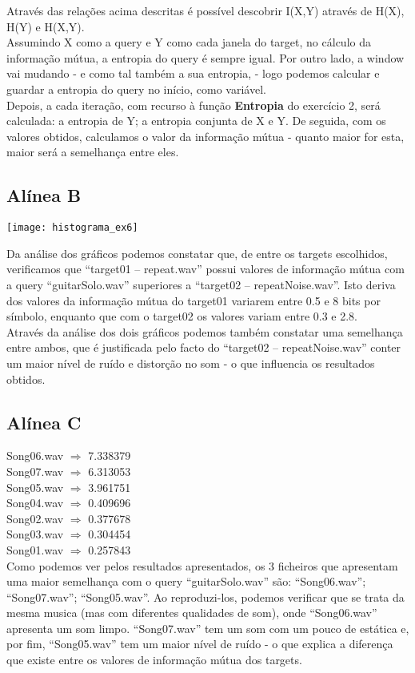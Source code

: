 \documentclass{article}
\begin{document}
Através das relações acima descritas é possível descobrir I(X,Y) através de H(X), H(Y) e H(X,Y).\\
Assumindo X como a query e Y como cada janela do target, no cálculo da informação mútua, a entropia do query é sempre igual. Por outro lado, a window vai mudando -  e como tal também a sua entropia, - logo podemos  calcular e guardar  a entropia do query no início, como variável.\\
Depois, a cada iteração, com recurso à função \textbf{Entropia} do exercício 2, será calculada: a entropia de Y; a entropia conjunta de X e Y. De seguida, com os valores obtidos, calculamos o valor da informação mútua - quanto maior for esta, maior será a semelhança entre eles.\\

\subsection{Alínea B}

\centerline{\texttt{[image: histograma\_ex6]}}
Da análise dos gráficos podemos constatar que, de entre os targets escolhidos, verificamos que “target01 – repeat.wav” possui valores de informação mútua com a query “guitarSolo.wav” superiores a “target02 – repeatNoise.wav”. Isto deriva dos valores da informação mútua do target01 variarem entre 0.5 e 8 bits por símbolo, enquanto que com o target02 os valores variam entre 0.3 e 2.8.\\
Através da análise dos dois  gráficos podemos também constatar uma semelhança entre ambos, que é justificada pelo facto do  “target02 – repeatNoise.wav” conter um maior nível de ruído e distorção no som - o que influencia os resultados obtidos.

\subsection{Alínea C}

Song06.wav $\Rightarrow$ 7.338379\\
Song07.wav $\Rightarrow$ 6.313053\\
Song05.wav $\Rightarrow$ 3.961751\\
Song04.wav $\Rightarrow$ 0.409696\\
Song02.wav $\Rightarrow$ 0.377678\\
Song03.wav $\Rightarrow$ 0.304454\\
Song01.wav $\Rightarrow$ 0.257843\\

Como podemos ver pelos resultados apresentados, os 3 ficheiros que apresentam uma maior semelhança com o query “guitarSolo.wav”  são: “Song06.wav”; “Song07.wav”; “Song05.wav”. Ao reproduzi-los, podemos verificar que se trata da mesma musica (mas com diferentes qualidades de som), onde “Song06.wav” apresenta um som limpo. “Song07.wav” tem um som com um pouco de estática e, por fim, “Song05.wav” tem um maior nível de ruído - o que explica a diferença que existe entre os valores de informação mútua dos targets.
\end{document}
